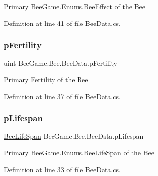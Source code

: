 Primary \hyperlink{namespace_bee_game_1_1_enums_acf7ae32a86385a40fc0c7b55af95c6c3}{Bee\+Game.\+Enums.\+Bee\+Effect} of the \hyperlink{namespace_bee_game_1_1_bee}{Bee} 



Definition at line 41 of file Bee\+Data.\+cs.

\mbox{\label{struct_bee_game_1_1_bee_1_1_bee_data_a12b5a0d54c6c9162a69a88c349b044d1}} 
\subsubsection{\texorpdfstring{p\+Fertility}{pFertility}}
{\footnotesize\ttfamily uint Bee\+Game.\+Bee.\+Bee\+Data.\+p\+Fertility}



Primary Fertility of the \hyperlink{namespace_bee_game_1_1_bee}{Bee} 



Definition at line 37 of file Bee\+Data.\+cs.

\mbox{\label{struct_bee_game_1_1_bee_1_1_bee_data_aa24b1efdb25e8c5592d88940f9afc1e9}} 
\subsubsection{\texorpdfstring{p\+Lifespan}{pLifespan}}
{\footnotesize\ttfamily \hyperlink{namespace_bee_game_1_1_enums_ae3853807ded2f4d99a0d4a7fb4b2bc46}{Bee\+Life\+Span} Bee\+Game.\+Bee.\+Bee\+Data.\+p\+Lifespan}



Primary \hyperlink{namespace_bee_game_1_1_enums_ae3853807ded2f4d99a0d4a7fb4b2bc46}{Bee\+Game.\+Enums.\+Bee\+Life\+Span} of the \hyperlink{namespace_bee_game_1_1_bee}{Bee} 



Definition at line 33 of file Bee\+Data.\+cs.

\mbox{\label{struct_bee_game_1_1_bee_1_1_bee_data_a8fa39d271a23500ad826041b46d9feaf}} 

